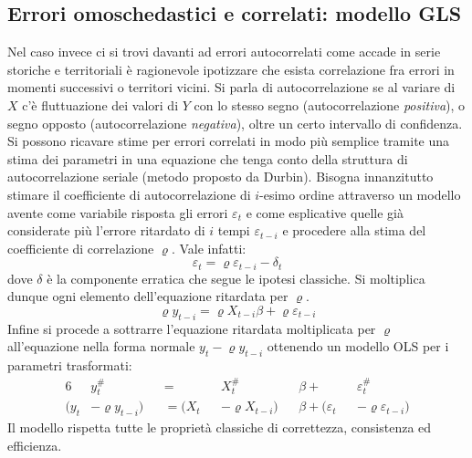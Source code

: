 \documentclass[a4page, 11pt]{article} %
\begin{document}
\subsection*{Errori omoschedastici e correlati: modello GLS}
Nel caso invece ci si trovi davanti ad errori autocorrelati come accade in serie storiche e territoriali è ragionevole ipotizzare che esista correlazione fra errori in momenti successivi o territori vicini.
Si parla di autocorrelazione se al variare di $X$ c'è fluttuazione dei valori di $Y$ con lo stesso segno (autocorrelazione \textit{positiva}), o segno opposto (autocorrelazione \textit{negativa}), oltre un certo intervallo di confidenza.
Si possono ricavare stime per errori correlati in modo più semplice tramite una stima dei parametri in una equazione che tenga conto della struttura di autocorrelazione seriale (metodo proposto da Durbin).
Bisogna innanzitutto stimare il coefficiente di autocorrelazione di $i$-esimo ordine attraverso un modello avente come variabile risposta gli errori $\varepsilon_t$ e come esplicative quelle già considerate più l’errore ritardato di $i$ tempi $\varepsilon_{t-i}$ e procedere alla stima del coefficiente di correlazione $\varrho$.
Vale infatti:
\begin{equation*}
  \varepsilon_t = \varrho \varepsilon_{t-i} - \delta_t
\end{equation*}
dove $\delta$ è la componente erratica che segue le ipotesi classiche.
Si moltiplica dunque ogni elemento dell'equazione ritardata per $\varrho$.
\begin{equation*}
  \varrho y_{t-i} = \varrho X_{t-i} \beta + \varrho \varepsilon_{t-i}
\end{equation*}
Infine si procede a sottrarre l'equazione ritardata moltiplicata per $\varrho$ all'equazione nella forma normale $y_t - \varrho y_{t-i}$ ottenendo un modello OLS per i parametri trasformati: 
\begin{alignat*}{6}
  &y_t^\# &&= &&X_t^\# &&\beta + &&\varepsilon_t^\# \\
  (y_t &- \varrho y_{t-i}) &&= (X_t &&- \varrho X_{t-i}) &&\beta + (\varepsilon_t &&- \varrho \varepsilon_{t-i})
\end{alignat*} 
Il modello rispetta tutte le proprietà classiche di correttezza, consistenza ed efficienza. 
\end{document}
